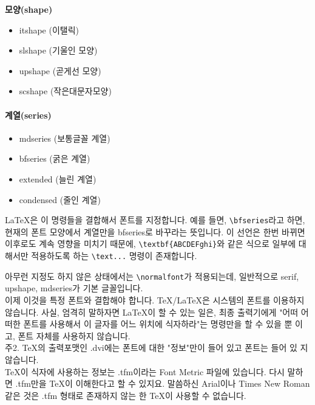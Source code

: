 			\textbf{모양(shape)}\\
			\begin{itemize}[topsep=-1.0em, itemsep=-0.5em]
			\item	itshape	(이탤릭)
			\item	slshape	(기울인 모양)
			\item	upshape	(곧게선 모양)
			\item	scshape	(작은대문자모양)
			\end{itemize}
			
			
			\paragraph*{계열(series)}
			\begin{itemize}[topsep=-1.0em, itemsep=-0.5em]
			\item	mdseries	(보통글꼴 계열)
			\item	bfseries		(굵은 계열)
			\item	extended	(늘린 계열)
			\item	condensed	(줄인 계열)
			\end{itemize}
			
			 
			LaTeX은 이 명령들을 결합해서 폰트를 지정합니다. 
			예를 들면, \verb|\bfseries|라고 하면, 
			현재의 폰트 모양에서 계열만을 bfseries로 바꾸라는 뜻입니다. 
			이 선언은 한번 바뀌면 이후로도 계속 영향을 미치기 때문에, 
			\verb|\textbf{ABCDEFghi}|와 같은 식으로 일부에 대해서만 적용하도록 하는 
			\verb|\text...| 명령이 존재합니다.
			
			아무런 지정도 하지 않은 상태에서는 \verb|\normalfont|가 적용되는데, 
			일반적으로 serif, upshape, mdseries가 기본 글꼴입니다. \\
			
			이제 이것을 특정 폰트와 결합해야 합니다. TeX/LaTeX은 시스템의 폰트를 이용하지 
			않습니다. 사실, 엄격히 말하자면 LaTeX이 할 수 있는 일은, 최종 출력기에게 "어떠
			어떠한 폰트를 사용해서 이 글자를 어느 위치에 식자하라"는 명령만을 할 수 있을 뿐
			이고, 폰트 자체를 사용하지 않습니다.\\
			
			 주2. TeX의 출력포맷인 .dvi에는 폰트에 대한 "정보"만이 들어 있고 폰트는 들어 있
			지 않습니다.\\
			
			TeX이 식자에 사용하는 정보는 .tfm이라는 Font Metric 파일에 있습니다. 
			다시 말하면 .tfm만을 TeX이 이해한다고 할 수 있지요. 
			말씀하신 Arial이나 Times New Roman 같은 것은 .tfm 형태로 존재하지 않는 한 
			TeX이 사용할 수 없습니다.
			
